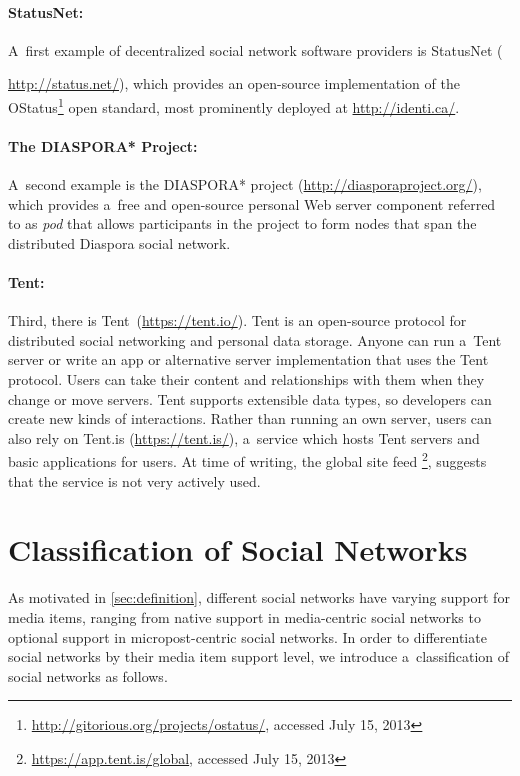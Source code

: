 \paragraph{StatusNet:}

A~first example of decentralized social network software providers
is StatusNet ({\url{http://status.net/}),
which provides an open-source implementation of the
OStatus\footnote{\url{http://gitorious.org/projects/ostatus/}, accessed July 15, 2013}
open standard, most prominently deployed
at \url{http://identi.ca/}.

\paragraph{The DIASPORA* Project:}

A~second example is the DIASPORA* project (\url{http://diasporaproject.org/}),
which provides a~free and open-source personal Web server component
referred to as \emph{pod} that allows
participants in the project to form nodes
that span the distributed Diaspora social network.

\paragraph{Tent:}

Third, there is Tent\texttrademark~(\url{https://tent.io/}).
Tent is an open-source protocol for distributed social networking
and personal data storage.
Anyone can run a~Tent server
or write an app or alternative server implementation
that uses the Tent protocol.
Users can take their content and relationships with them
when they change or move servers.
Tent supports extensible data types,
so developers can create new kinds of interactions.
Rather than running an own server,
users can also rely on Tent.is (\url{https://tent.is/}),
a~service which hosts Tent servers
and basic applications for users.
At time of writing, the global site feed%
\footnote{\url{https://app.tent.is/global},
accessed July 15, 2013},
suggests that the service is not very actively used.

\section{Classification of Social Networks}
\label{sec:classification-of-social-networks}

As motivated in \autoref{sec:definition},
different social networks have varying support
for media items, ranging from native support
in media-centric social networks
to optional support in micropost-centric social networks.
In order to differentiate social networks by their
media item support level,
we introduce a~classification of social networks as follows.

}

